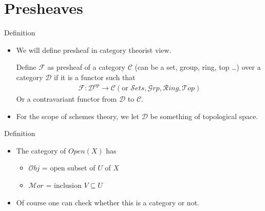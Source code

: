 \documentclass[10pt,aspectratio=1610]{beamer}
\theoremstyle{definition}
\begin{document}
    \section{Presheaves}
    \begin{frame}{Definition}
        \begin{itemize}
            \item We will define presheaf in category theorist view.
            \begin{definition}[Presheaf]
            Define $\mathcal{F}$ as presheaf of a category $\mathcal{C}$ (can be a set, group, ring, top \dots) over a category $\mathcal{D}$ if it is a functor such that 
            \begin{align*}
                \mathcal{F}: \mathcal{D}^{op} \to \mathcal{C} (\text{or }\mathcal{S}ets, \mathcal{G}rp, \mathcal{R}ing, \mathcal{T}op)
            \end{align*}
            Or a contravariant functor from $\mathcal{D}$ to $\mathcal{C}$.
        \end{definition}
            \item For the scope of schemes theory, we let $\mathcal{D}$ be something of topological space.
        \end{itemize}
        
    \end{frame}


    \begin{frame}{Definition}
        \begin{itemize}
            \begin{definition}
                Let $X$ be a topological space, define $\mathcal{F}$ as \textbf{presheaf over}  $X$ if it is a contravariant functor from $Open(X)$ (the category of open subsets of $X$) to a category $\mathcal{C}$. We can write it as 
                \begin{align*}
                    \mathcal{F}: Open(X)^{op} \to \mathcal{C}
                \end{align*}
            \end{definition}
            \item The category of $Open(X)$ has
            \begin{itemize}
                \item $\mathcal{O}bj$ = open subset of $U$ of $X$
                \item $\mathcal{M}or$ = inclusion $V \subseteq U$
            \end{itemize}
            \item Of course one can check whether this is a category or not. 
            
        \end{itemize}
    \end{frame}
\end{document}
